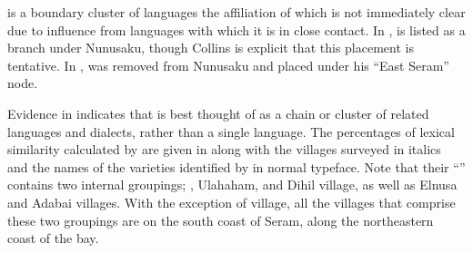 \largerpage
{}
 is a boundary cluster of languages the affiliation
of which is not immediately clear due to influence from  languages with which it is in close contact.
In \citet[20, 37]{Collins1983},
 is listed as a branch under Nunusaku,
though Collins is explicit that this placement is tentative.
In \citet{Collins1986},  was removed from Nunusaku
and placed under his “East Seram” node.

Evidence in \citet[117--121]{LoskiLoski1989} indicates that
 is best thought of as a chain or cluster of
related languages and dialects, rather than a single language.
The percentages of lexical similarity calculated by \citet[119]{LoskiLoski1989}
are given in  along with the villages surveyed in
italics and the names of the varieties identified by \citet{LoskiLoski1989} in normal typeface.
Note that their “” contains two internal groupings; ,
Ulahaham, and Dihil village, as well as Elnusa and Adabai villages.
With the exception of  village,
all the villages that comprise these two groupings are on the
south coast of Seram,
along the northeastern coast of the  bay.


